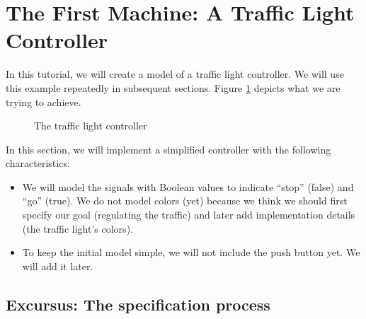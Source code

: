 \section{The First Machine: A Traffic Light Controller}
\label{tut_first_machine}



In this tutorial, we will create a model of a traffic light controller.  We will use this example repeatedly in subsequent sections.  Figure \ref{fig_tut_03_traffic_light} depicts what we are trying to achieve.


\begin{figure}[!ht]
\begin{center}
	\caption{The traffic light controller}
	\label{fig_tut_03_traffic_light}
\end{center}
\end{figure}

In this section, we will implement a simplified controller with the following characteristics:
\begin{itemize}
	\item We will model the signals with Boolean values to indicate ``stop'' (false) and ``go'' (true).  We do not model colors (yet) because
      we think we should first specify our goal (regulating the traffic) and later add implementation details (the traffic light's colors).
	\item To keep the initial model simple, we will not include the push button yet. We will add it later.
\end{itemize}

\subsection{Excursus: The specification process}
\label{tut_excursus_the_sepcification_process}

